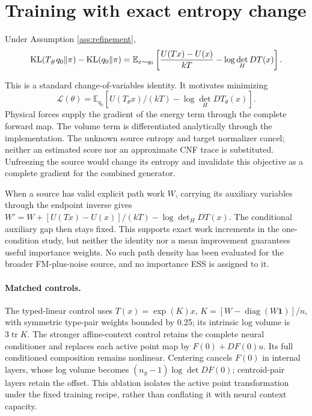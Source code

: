 \section{Training with exact entropy change}
\begin{proposition}
Under Assumption \ref{ass:refinement},
\begin{equation}
 \operatorname{KL}(T_\#q_0\Vert\pi)-\operatorname{KL}(q_0\Vert\pi)
 =\mathbb E_{x\sim q_0}\left[
   \frac{U(Tx)-U(x)}{kT}-\log\det_H DT(x)\right].
 \label{eq:relative-kl}
\end{equation}
\label{prop:relative-kl}
\end{proposition}
This is a standard change-of-variables identity. It motivates minimizing
\begin{equation}
 \mathcal L(\theta)=\mathbb E_{q_0}\left[
     U(T_\theta x)/(kT)-\log\det_H DT_\theta(x)\right].
 \label{eq:refinement-loss}
\end{equation}
Physical forces supply the gradient of the energy term through the complete
forward map. The volume term is differentiated analytically through the
implementation. The unknown source entropy and target normalizer cancel;
neither an estimated score nor an approximate CNF trace is substituted.
Unfreezing the source would change its entropy and invalidate this objective
as a complete gradient for the combined generator.

When a source has valid explicit path work $W$, carrying its auxiliary
variables through the endpoint inverse gives
$W'=W+[U(Tx)-U(x)]/(kT)-\log\det_HDT(x)$. The conditional auxiliary gap then
stays fixed. This supports exact work increments in the one-condition study,
but neither the identity nor a mean improvement guarantees useful importance
weights. No such path density has been evaluated for the broader FM-plus-noise
source, and no importance ESS is assigned to it.

\paragraph{Matched controls.}
The typed-linear control uses $T(x)=\exp(K)x$,
$K=[W-\operatorname{diag}(W\mathbf1)]/n$, with symmetric type-pair weights
bounded by 0.25; its intrinsic log volume is $3\operatorname{tr}K$.
The stronger affine-context control retains the complete neural conditioner
and replaces each active point map by $F(0)+DF(0)u$. Its full conditioned
composition remains nonlinear. Centering cancels $F(0)$ in internal layers,
whose log volume becomes $(n_g-1)\log\det DF(0)$; centroid-pair layers retain
the offset. This ablation isolates the active point transformation under the
fixed training recipe, rather than conflating it with neural context capacity.

